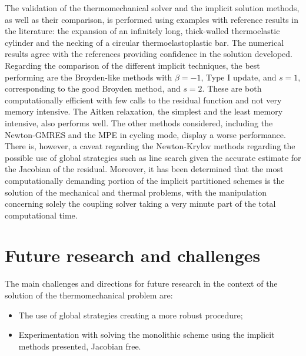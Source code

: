 The validation of the thermomechanical solver and the implicit solution methods, as well as their comparison, is performed using examples with reference results in the literature: the expansion of an infinitely long, thick-walled thermoelastic cylinder and the necking of a circular thermoelastoplastic bar.
The numerical results agree with the references providing confidence in the solution developed.
Regarding the comparison of the different implicit techniques, the best performing are the Broyden-like methods with \(\beta=-1\), Type I update, and \(s=1\), corresponding to the good Broyden method, and \(s=2\).
These are both computationally efficient with few calls to the residual function and not very memory intensive.
The Aitken relaxation, the simplest and the least memory intensive, also performs well.
The other methods considered, including the Newton-GMRES and the MPE in cycling mode, display a worse performance.
There is, however, a caveat regarding the Newton-Krylov methods regarding the possible use of global strategies such as line search given the accurate estimate for the Jacobian of the residual.
Moreover, it has been determined that the most computationally demanding portion of the implicit partitioned schemes is the solution of the mechanical and thermal problems, with the manipulation concerning solely the coupling solver taking a very minute part of the total computational time.

\section{Future research and challenges}

The main challenges and directions for future research in the context of the solution of the thermomechanical problem are:
\begin{itemize}
  \item The use of global strategies creating a more robust procedure;
  \item Experimentation with solving the monolithic scheme using the implicit methods presented, Jacobian free.
\end{itemize}
